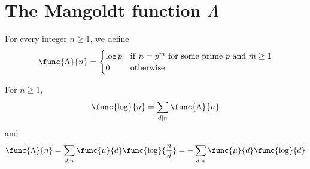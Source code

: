 \section{The Mangoldt function \(\Lambda\)}
\begin{definition}
    For every integer \(n \geq 1\), we define 
    \begin{equation*}
        \func{\Lambda}{n} = \begin{cases}
            \log p & \mathrm{if\ } n = p^m \mathrm{\ for\ some\ prime\ } p \mathrm{\ and\ } m \geq 1\\
            0 & \mathrm{otherwise}
        \end{cases}
    \end{equation*}
\end{definition}
\begin{theorem}
    For \(n \geq 1\),
    \begin{equation*}
        \func{\log}{n} = \sum_{d \mid n} \func{\Lambda}{n}
    \end{equation*}
    and 
    \begin{equation*}
        \func{\Lambda}{n} = \sum_{d \mid n} \func{\mu}{d} \func{\log}{\frac{n}{d}} = - \sum_{d \mid n} \func{\mu}{d} \func{\log}{d}
    \end{equation*}
\end{theorem}

